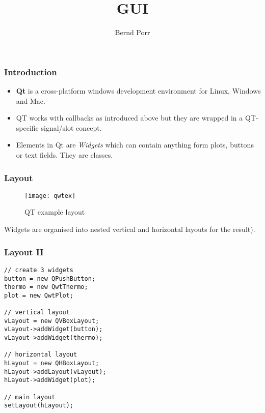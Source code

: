 \documentclass[xcolor=dvipsnames]{beamer}
\date{}
\title{GUI}
\author{Bernd Porr}
\begin{document}
\begin{frame}
\titlepage
\end{frame}

\begin{frame}[fragile]
  \frametitle{Introduction}

\begin{itemize}
\item \textbf{Qt} is a cross-platform windows development environment for
Linux, Windows and Mac.

\item QT works with callbacks as introduced above
but they are wrapped in a QT-specific signal/slot concept.

\item Elements in Qt are \textsl{Widgets} which can contain anything form
  plots, buttons or text fields. They are classes.
  
\end{itemize}
  
\end{frame}



\begin{frame}[fragile]
  \frametitle{Layout}

\begin{figure}[!hbt]
\begin{center}
\mbox{\texttt{[image: qwtex]}}
\end{center}
\caption{QT example layout
\label{qwtex}}
\end{figure}

Widgets are organised into
nested vertical and horizontal layouts
for the result).
\end{frame}



\begin{frame}[fragile]
  \frametitle{Layout II}

\begin{verbatim}
// create 3 widgets
button = new QPushButton;
thermo = new QwtThermo; 
plot = new QwtPlot;

// vertical layout
vLayout = new QVBoxLayout;
vLayout->addWidget(button);
vLayout->addWidget(thermo);

// horizontal layout
hLayout = new QHBoxLayout;
hLayout->addLayout(vLayout);
hLayout->addWidget(plot);

// main layout
setLayout(hLayout);
\end{verbatim}
\end{frame}
\end{document}
